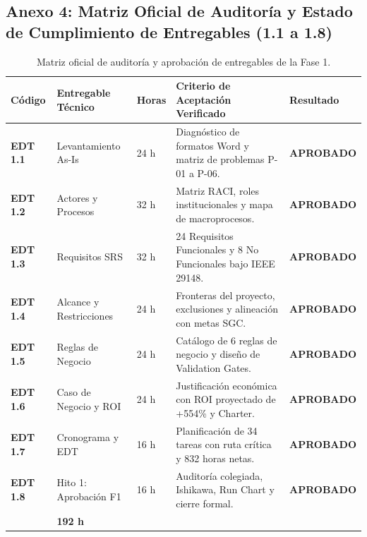 \documentclass[12pt,a4paper]{article}
\begin{document}
\subsection*{Anexo 4: Matriz Oficial de Auditoría y Estado de Cumplimiento de Entregables (1.1 a 1.8)}
\begin{table}[H]
\centering
\small
\renewcommand{\arraystretch}{1.2}
\begin{tabularx}{\textwidth}{|>{\hsize=0.55\hsize\centering\arraybackslash\bfseries\footnotesize}X|>{\hsize=1.15\hsize\raggedright\arraybackslash\footnotesize}X|>{\hsize=0.50\hsize\centering\arraybackslash\footnotesize}X|>{\hsize=2.10\hsize\raggedright\arraybackslash\footnotesize}X|>{\hsize=0.70\hsize\centering\arraybackslash\footnotesize}X|}
\hline
\rowcolor{tableheader}
\textbf{Código} & \textbf{Entregable Técnico} & \textbf{Horas} & \textbf{Criterio de Aceptación Verificado} & \textbf{Resultado} \\
\hline
\textbf{EDT 1.1} & Levantamiento As-Is & 24 h & Diagnóstico de formatos Word y matriz de problemas P-01 a P-06. & \textbf{APROBADO} \\
\hline
\textbf{EDT 1.2} & Actores y Procesos & 32 h & Matriz RACI, roles institucionales y mapa de macroprocesos. & \textbf{APROBADO} \\
\hline
\textbf{EDT 1.3} & Requisitos SRS & 32 h & 24 Requisitos Funcionales y 8 No Funcionales bajo IEEE 29148. & \textbf{APROBADO} \\
\hline
\textbf{EDT 1.4} & Alcance y Restricciones & 24 h & Fronteras del proyecto, exclusiones y alineación con metas SGC. & \textbf{APROBADO} \\
\hline
\textbf{EDT 1.5} & Reglas de Negocio & 24 h & Catálogo de 6 reglas de negocio y diseño de Validation Gates. & \textbf{APROBADO} \\
\hline
\textbf{EDT 1.6} & Caso de Negocio y ROI & 24 h & Justificación económica con ROI proyectado de +554\% y Charter. & \textbf{APROBADO} \\
\hline
\textbf{EDT 1.7} & Cronograma y EDT & 16 h & Planificación de 34 tareas con ruta crítica y 832 horas netas. & \textbf{APROBADO} \\
\hline
\textbf{EDT 1.8} & Hito 1: Aprobación F1 & 16 h & Auditoría colegiada, Ishikawa, Run Chart y cierre formal. & \textbf{APROBADO} \\
\hline
\multicolumn{2}{|r|}{\textbf{TOTAL HORAS FASE 1:}} & \textbf{192 h} & \multicolumn{2}{l|}{\textbf{100\% de Entregables Auditados y Aprobados}} \\
\hline
\end{tabularx}
\caption{Matriz oficial de auditoría y aprobación de entregables de la Fase 1.}
\end{table}
\end{document}
